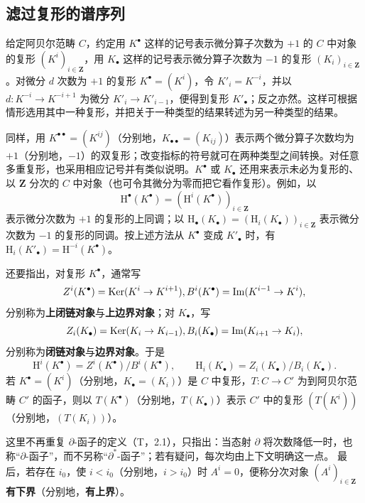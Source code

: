 \subsection{滤过复形的谱序列}
给定阿贝尔范畴 $C$，约定用 $K^\bullet$ 这样的记号表示微分算子次数为 $+1$ 的 $C$ 中对象的复形 $(K^i)_{i\in\mathbf Z}$，用 $K_\bullet$ 这样的记号表示微分算子次数为 $-1$ 的复形 $(K_i)_{i\in\mathbf Z}$。对微分 $d$ 次数为 $+1$ 的复形 $K^\bullet=(K^i)$，令 $K'_i=K^{-i}$，并以 $d:K^{-i}\to K^{-i+1}$ 为微分 $K'_i\to K'_{i-1}$，便得到复形 $K'_\bullet$；反之亦然。这样可根据情形选用其中一种复形，并把关于一种类型的结果转述为另一种类型的结果。

同样，用 $K^{\bullet\bullet}=(K^{ij})$（分别地，$K_{\bullet\bullet}=(K_{ij})$）表示两个微分算子次数均为 $+1$（分别地，$-1$）的双复形；改变指标的符号就可在两种类型之间转换。对任意多重复形，也采用相应记号并有类似说明。$K^\bullet$ 或 $K_\bullet$ 还用来表示未必为复形的、以 $\mathbf Z$ 分次的 $C$ 中对象（也可令其微分为零而把它看作复形）。例如，以
\[
\mathrm H^\bullet(K^\bullet)=(\mathrm H^i(K^\bullet))_{i\in\mathbf Z}
\]
表示微分次数为 $+1$ 的复形的上同调；以 $\mathrm H_\bullet(K_\bullet)=(\mathrm H_i(K_\bullet))_{i\in\mathbf Z}$ 表示微分次数为 $-1$ 的复形的同调。按上述方法从 $K^\bullet$ 变成 $K'_\bullet$ 时，有 $\mathrm H_i(K'_\bullet)=\mathrm H^{-i}(K^\bullet)$。

还要指出，对复形 $K^\bullet$，通常写
\[
Z^i(K^\bullet)=\operatorname{Ker}(K^i\to K^{i+1}),
B^i(K^\bullet)=\operatorname{Im}(K^{i-1}\to K^i),
\]
分别称为\textbf{上闭链对象}与\textbf{上边界对象}；对 $K_\bullet$，写
\[
Z_i(K_\bullet)=\operatorname{Ker}(K_i\to K_{i-1}),
B_i(K_\bullet)=\operatorname{Im}(K_{i+1}\to K_i),
\]
分别称为\textbf{闭链对象}与\textbf{边界对象}。于是
\[
\mathrm H^i(K^\bullet)=Z^i(K^\bullet)/B^i(K^\bullet),\qquad
\mathrm H_i(K_\bullet)=Z_i(K_\bullet)/B_i(K_\bullet).
\]
若 $K^\bullet=(K^i)$（分别地，$K_\bullet=(K_i)$）是 $C$ 中复形，$T:C\to C'$ 为到阿贝尔范畴 $C'$ 的函子，则以 $T(K^\bullet)$（分别地，$T(K_\bullet)$）表示 $C'$ 中的复形 $(T(K^i))$（分别地，$(T(K_i))$）。

这里不再重复 $\partial$-函子的定义（T，2.1），只指出：当态射 $\partial$ 将次数降低一时，也称“$\partial$-函子”，而不另称“$\partial^*$-函子”；若有疑问，每次均由上下文明确这一点。
最后，若存在 $i_0$，使 $i<i_0$（分别地，$i>i_0$）时 $A^i=0$，便称分次对象 $(A^i)_{i\in\mathbf Z}$ \textbf{有下界}（分别地，\textbf{有上界}）。


